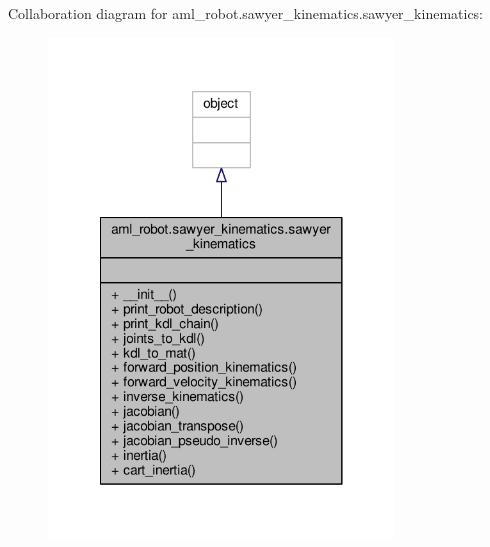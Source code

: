 Collaboration diagram for aml\-\_\-robot.\-sawyer\-\_\-kinematics.\-sawyer\-\_\-kinematics\-:\nopagebreak
\begin{figure}[H]
\begin{center}
\leavevmode
\includegraphics[width=260pt]{classaml__robot_1_1sawyer__kinematics_1_1sawyer__kinematics__coll__graph}
\end{center}
\end{figure}
